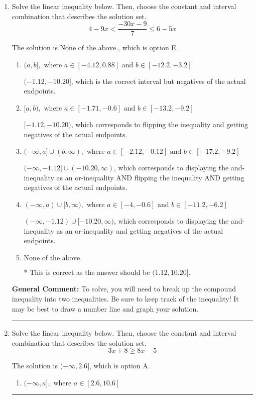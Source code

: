 \documentclass{extbook}[14pt]
\newcommand{\litem}[1]{\item #1

\rule{\textwidth}{0.4pt}}
\begin{document}
\begin{enumerate}\litem{
Solve the linear inequality below. Then, choose the constant and interval combination that describes the solution set.
\[ 4 - 9 x < \frac{-30 x - 9}{7} \leq 6 - 5 x \]

The solution is \( \text{None of the above.} \), which is option E.\begin{enumerate}[label=\Alph*.]
\item \( (a, b], \text{ where } a \in [-4.12, 0.88] \text{ and } b \in [-12.2, -3.2] \)

$(-1.12, -10.20]$, which is the correct interval but negatives of the actual endpoints.
\item \( [a, b), \text{ where } a \in [-1.71, -0.6] \text{ and } b \in [-13.2, -9.2] \)

$[-1.12, -10.20)$, which corresponds to flipping the inequality and getting negatives of the actual endpoints.
\item \( (-\infty, a] \cup (b, \infty), \text{ where } a \in [-2.12, -0.12] \text{ and } b \in [-17.2, -9.2] \)

$(-\infty, -1.12] \cup (-10.20, \infty)$, which corresponds to displaying the and-inequality as an or-inequality AND flipping the inequality AND getting negatives of the actual endpoints.
\item \( (-\infty, a) \cup [b, \infty), \text{ where } a \in [-4, -0.6] \text{ and } b \in [-11.2, -6.2] \)

$(-\infty, -1.12) \cup [-10.20, \infty)$, which corresponds to displaying the and-inequality as an or-inequality and getting negatives of the actual endpoints.
\item \( \text{None of the above.} \)

* This is correct as the answer should be $(1.12, 10.20]$.
\end{enumerate}

\textbf{General Comment:} To solve, you will need to break up the compound inequality into two inequalities. Be sure to keep track of the inequality! It may be best to draw a number line and graph your solution.
}
\litem{
Solve the linear inequality below. Then, choose the constant and interval combination that describes the solution set.
\[ 3x + 8 \geq 8x -5 \]

The solution is \( (-\infty, 2.6] \), which is option A.\begin{enumerate}[label=\Alph*.]
\item \( (-\infty, a], \text{ where } a \in [2.6, 10.6] \)


\end{enumerate}}
\end{enumerate}
\end{document}
